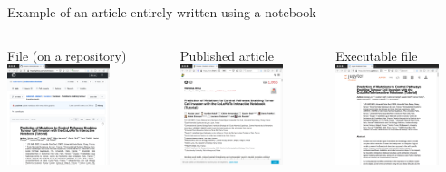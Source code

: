 \begin{frame}{Example of an article entirely written using a notebook}
\begin{columns}

File (on a repository)\newline
\newline
\centering\includegraphics[width=3cm]{07_notebook/images/article_github.png}

Published article\newline
\newline
\centering\includegraphics[width=3cm]{07_notebook/images/article_frontiers.png}

Executable file\newline
\newline
\centering\includegraphics[width=3cm]{07_notebook/images/article_nbviewer.png}

\end{columns}

\end{frame}

%


